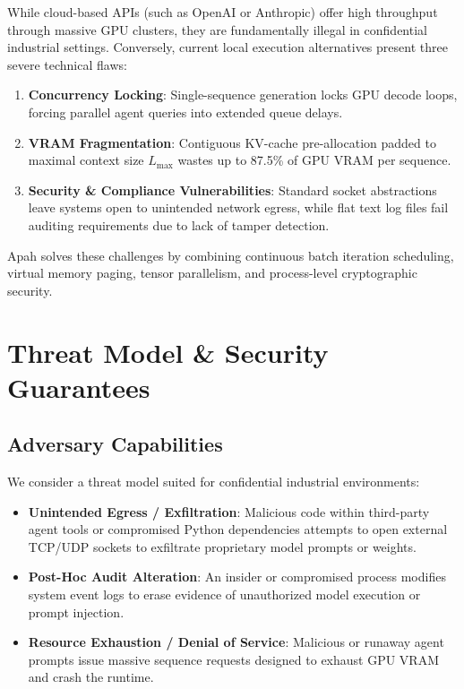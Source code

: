 \documentclass[10pt,twocolumn,a4paper]{article}
\theoremstyle{definition}
\theoremstyle{remark}
\begin{document}
While cloud-based APIs (such as OpenAI or Anthropic) offer high throughput through massive GPU clusters, they are fundamentally illegal in confidential industrial settings. Conversely, current local execution alternatives present three severe technical flaws:
\begin{enumerate}
    \item \textbf{Concurrency Locking}: Single-sequence generation locks GPU decode loops, forcing parallel agent queries into extended queue delays.
    \item \textbf{VRAM Fragmentation}: Contiguous KV-cache pre-allocation padded to maximal context size $L_{\text{max}}$ wastes up to 87.5\% of GPU VRAM per sequence.
    \item \textbf{Security \& Compliance Vulnerabilities}: Standard socket abstractions leave systems open to unintended network egress, while flat text log files fail auditing requirements due to lack of tamper detection.
\end{enumerate}

Apah solves these challenges by combining continuous batch iteration scheduling, virtual memory paging, tensor parallelism, and process-level cryptographic security.

\section{Threat Model \& Security Guarantees}
\label{sec:threat_model}

\subsection{Adversary Capabilities}
We consider a threat model suited for confidential industrial environments:
\begin{itemize}
    \item \textbf{Unintended Egress / Exfiltration}: Malicious code within third-party agent tools or compromised Python dependencies attempts to open external TCP/UDP sockets to exfiltrate proprietary model prompts or weights.
    \item \textbf{Post-Hoc Audit Alteration}: An insider or compromised process modifies system event logs to erase evidence of unauthorized model execution or prompt injection.
    \item \textbf{Resource Exhaustion / Denial of Service}: Malicious or runaway agent prompts issue massive sequence requests designed to exhaust GPU VRAM and crash the runtime.
\end{itemize}
\end{document}
